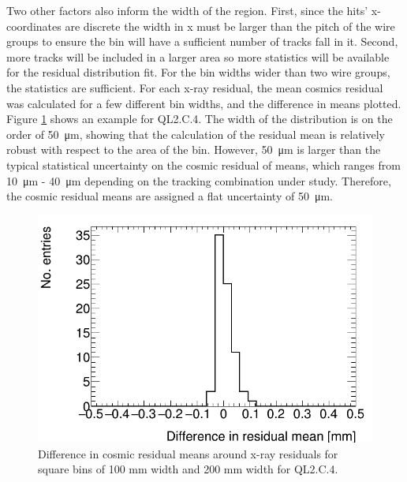Two other factors also inform the width of the region. First, since the hits' x-coordinates are discrete the width in x must be larger than the pitch of the wire groups to ensure the bin will have a sufficient number of tracks fall in it. Second, more tracks will be included in a larger area so more statistics will be available for the residual distribution fit. For the bin widths wider than two wire groups, the statistics are sufficient. For each x-ray residual, the mean cosmics residual was calculated for a few different bin widths, and the difference in means plotted. Figure \ref{fig:area_bin_size_mean_diff} shows an example for QL2.C.4. The width of the distribution is on the order of \SI{50}{\micro\meter}, showing that the calculation of the residual mean is relatively robust with respect to the area of the bin. However, \SI{50}{\micro\meter} is larger than the typical statistical uncertainty on the cosmic residual of means, which ranges from \SI{10}{\micro\meter} - \SI{40}{\micro\meter} depending on the tracking combination under study. Therefore, the cosmic residual means are assigned a flat uncertainty of \SI{50}{\micro\meter}. 

\begin{figure}
    \centering
    \includegraphics[width = \textwidth]{figures/compare_residual_fits_around_xrays_QL2C04_3100V_2021-05-20_100mm_width_bins_minus_QL2C04_3100V_2021-06-02_200mm_width_bins_means_difference.png}
    \caption{Difference in cosmic residual means around x-ray residuals for square bins of 100 mm width and 200 mm width for QL2.C.4.}
    \label{fig:area_bin_size_mean_diff}
\end{figure}